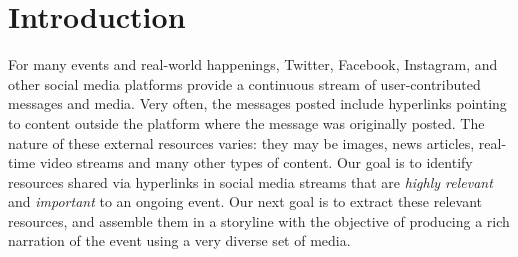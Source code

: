 \documentclass{sig-alternate-somus}
\begin{document}


\section{Introduction}
\label{sec:introduction}


For many events and real-world happenings, Twitter, Facebook, Instagram, and other social media platforms provide a continuous stream of user-contributed messages and media. Very often, the messages posted include hyperlinks pointing to content outside the platform where the message was originally posted. The nature of these external resources varies: they may be images, news articles, real-time video streams and many other types of content. Our goal is to identify resources shared via hyperlinks in social media streams that are \emph{highly relevant} and \emph{important} to an ongoing event. Our next goal is to extract these relevant resources, and assemble them in a storyline with the objective of producing a rich narration of the event using a very diverse set of media.
\end{document}
